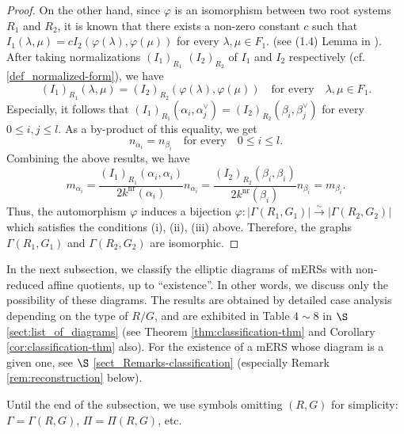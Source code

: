 \documentclass[11pt]{amsart}
\newcommand{\nr}{\mathrm{nr}}
\begin{document}
{\begin{proof}
On the other hand, since $\varphi$ is an isomorphism between two root 
systems $R_1$ and $R_2$, it is known that there exists a non-zero constant 
$c$ such that 
$I_1(\lambda,\mu)=c I_2(\varphi(\lambda),\varphi(\mu))$ for every 
$\lambda,\mu\in F_1$. 
(see (1.4) Lemma in \cite{Saito1985}). After taking normalizations $(I_1)_{R_1}$
$(I_2)_{R_2}$ of $I_1$ and $I_2$ respectively 
(cf. \eqref{def_normalized-form}),  we have
\begin{equation}\label{isometry}
(I_1)_{R_1}(\lambda,\mu)=
(I_2)_{R_2}(\varphi(\lambda),\varphi(\mu))\quad\text{for every}\quad 
\lambda,\mu\in F_1.
\end{equation} 
Especially, it follows that
$(I_1)_{R_1}(\alpha_i,\alpha_j^\vee)
=(I_2)_{R_2}(\beta_i,\beta_j^\vee)$
for every $0\leq i,j\leq l$.
As a by-product of this equality, we get 
\[n_{\alpha_i}=n_{\beta_i}\quad \text{for every}\quad 0\leq i\leq l.\]
Combining the above results, we have
\[m_{\alpha_i}=\frac{(I_1)_{R_1}(\alpha_i,\alpha_i)}{2k^{\nr}(\alpha_i)}n_{\alpha_i}
=\frac{(I_2)_{R_2}(\beta_i,\beta_i)}{2k^{\nr}(\beta_i)}n_{\beta_i}=m_{\beta_i}.\]
Thus, the automorphism $\varphi$ induces a bijection 
$\varphi:|\Gamma(R_1,G_1)|\xrightarrow{\sim}|\Gamma(R_2,G_2)|$ which 
satisfies the conditions (i), (ii), (iii) above. Therefore, the graphs 
$\Gamma(R_1,G_1)$ and $\Gamma(R_2,G_2)$ are isomorphic.
\end{proof}
In the next subsection, we classify the elliptic diagrams of mERSs with non-reduced
affine quotients, up to ``existence''. 
In other words,  we discuss only the possibility of these diagrams.  
The results are obtained by detailed case analysis depending on the type of $R/G$, 
and are exhibited in Table $4\sim 8$ in $\S$ \ref{sect:list_of_diagrams} (see Theorem
\ref{thm:classification-thm} and Corollary \ref{cor:classification-thm} also). 
For the existence of a mERS whose  diagram is a given one, see $\S$ 
\ref{sect_Remarks-classification} (especially Remark \ref{rem:reconstruction} below).

Until the end of the subsection, we use symbols omitting $(R,G)$ for simplicity: 
$\Gamma=\Gamma(R,G)$, $\Pi=\Pi(R,G)$, etc.
}
\end{document}
